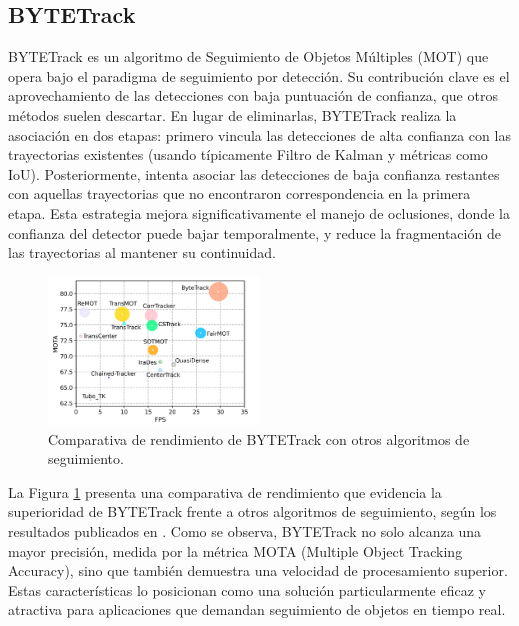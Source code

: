 \documentclass[11pt,spanish,listoffigures,listoftables]{tfgetsinf}
\begin{document}
\subsection{BYTETrack}

BYTETrack\cite{zhang2022bytetrackmultiobjecttrackingassociating} es un algoritmo de Seguimiento de Objetos Múltiples (MOT) que opera bajo el paradigma de seguimiento por detección. Su contribución clave es el aprovechamiento de las detecciones con baja puntuación de confianza, que otros métodos suelen descartar. En lugar de eliminarlas, BYTETrack realiza la asociación en dos etapas: primero vincula las detecciones de alta confianza con las trayectorias existentes (usando típicamente Filtro de Kalman y métricas como IoU). Posteriormente, intenta asociar las detecciones de baja confianza restantes con aquellas trayectorias que no encontraron correspondencia en la primera etapa. Esta estrategia mejora significativamente el manejo de oclusiones, donde la confianza del detector puede bajar temporalmente, y reduce la fragmentación de las trayectorias al mantener su continuidad.

\begin{figure}[H]
   \centering
   \includegraphics[width=0.5\textwidth]{images/estado_del_arte/BYTETrack_MOTA.png}
   \caption{Comparativa de rendimiento de BYTETrack con otros algoritmos de seguimiento.}
   \label{fig:bytetrack_mota}
\end{figure}

La Figura \ref{fig:bytetrack_mota} presenta una comparativa de rendimiento que evidencia la superioridad de BYTETrack frente a otros algoritmos de seguimiento, según los resultados publicados en \cite{zhang2022bytetrackmultiobjecttrackingassociating}. Como se observa, BYTETrack no solo alcanza una mayor precisión, medida por la métrica MOTA (Multiple Object Tracking Accuracy), sino que también demuestra una velocidad de procesamiento superior. Estas características lo posicionan como una solución particularmente eficaz y atractiva para aplicaciones que demandan seguimiento de objetos en tiempo real.
\end{document}
